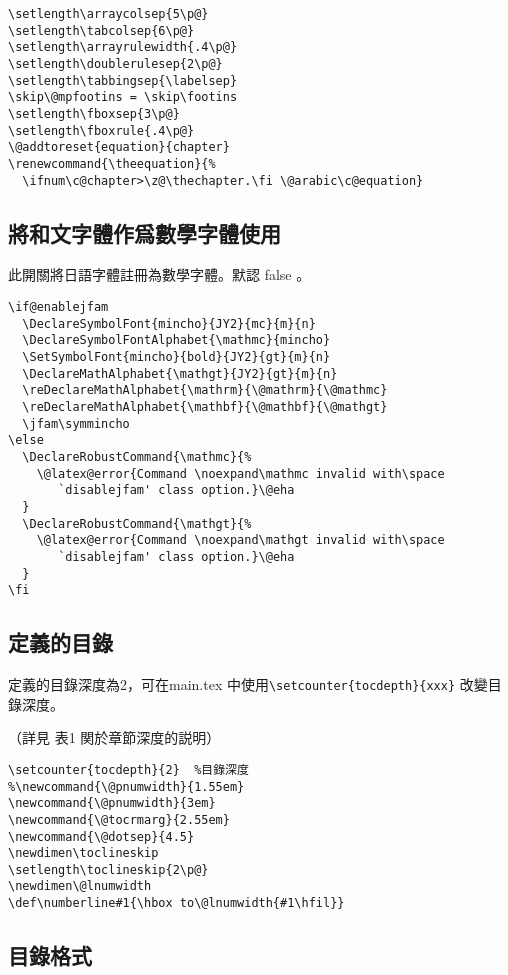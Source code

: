 \begin{lstlisting}[firstnumber=887]
\setlength\arraycolsep{5\p@}
\setlength\tabcolsep{6\p@}
\setlength\arrayrulewidth{.4\p@}
\setlength\doublerulesep{2\p@}
\setlength\tabbingsep{\labelsep}
\skip\@mpfootins = \skip\footins
\setlength\fboxsep{3\p@}
\setlength\fboxrule{.4\p@}
\@addtoreset{equation}{chapter}
\renewcommand{\theequation}{%
  \ifnum\c@chapter>\z@\thechapter.\fi \@arabic\c@equation}
\end{lstlisting}

\subsection{將和文字體作爲數學字體使用}

\par 此開關將日語字體註冊為數學字體。默認 false 。
\begin{lstlisting}[firstnumber=900]
\if@enablejfam
  \DeclareSymbolFont{mincho}{JY2}{mc}{m}{n}
  \DeclareSymbolFontAlphabet{\mathmc}{mincho}
  \SetSymbolFont{mincho}{bold}{JY2}{gt}{m}{n}
  \DeclareMathAlphabet{\mathgt}{JY2}{gt}{m}{n}
  \reDeclareMathAlphabet{\mathrm}{\@mathrm}{\@mathmc}
  \reDeclareMathAlphabet{\mathbf}{\@mathbf}{\@mathgt}
  \jfam\symmincho
\else
  \DeclareRobustCommand{\mathmc}{%
    \@latex@error{Command \noexpand\mathmc invalid with\space
       `disablejfam' class option.}\@eha
  }
  \DeclareRobustCommand{\mathgt}{%
    \@latex@error{Command \noexpand\mathgt invalid with\space
       `disablejfam' class option.}\@eha
  }
\fi
\end{lstlisting}



\subsection{定義的目錄}

\par 定義的目錄深度為2，可在main.tex 中使用\verb+\setcounter{tocdepth}{xxx}+
改變目錄深度。
\par （詳見 表1 関於章節深度的説明）
%
\begin{lstlisting}[firstnumber=920]
\setcounter{tocdepth}{2}  %目錄深度
%\newcommand{\@pnumwidth}{1.55em}
\newcommand{\@pnumwidth}{3em}
\newcommand{\@tocrmarg}{2.55em}
\newcommand{\@dotsep}{4.5}
\newdimen\toclineskip
\setlength\toclineskip{2\p@}
\newdimen\@lnumwidth
\def\numberline#1{\hbox to\@lnumwidth{#1\hfil}}
\end{lstlisting}

\subsection{目錄格式}

